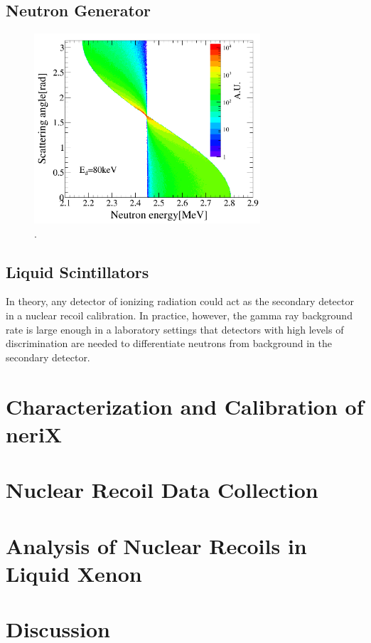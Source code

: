 


\subsection{Neutron Generator}


\begin{figure}[t]
        \centering
	\includegraphics[width=0.75\textwidth]{nerix_minitron_angular_spec}
	\caption{.}
	\label{fig:nerix_minitron_angular_spec}
\end{figure}


\subsection{Liquid Scintillators}


In theory, any detector of ionizing radiation could act as the secondary detector in a nuclear recoil calibration.  In practice, however, the gamma ray background rate is large enough in a laboratory settings that detectors with high levels of discrimination are needed to differentiate neutrons from background in the secondary detector.  



\section{Characterization and Calibration of neriX}


\section{Nuclear Recoil Data Collection}


\section{Analysis of Nuclear Recoils in Liquid Xenon}


\section{Discussion}




